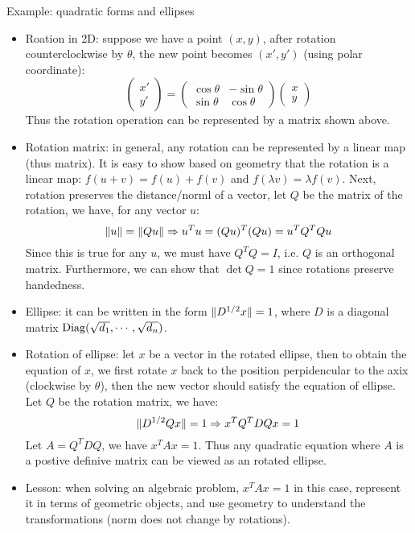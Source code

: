 \documentclass{report}
\begin{document}
Example: quadratic forms and ellipses
\begin{itemize}
	\item Roation in 2D: suppose we have a point $(x,y)$, after rotation counterclockwise by $\theta$, the new point becomes $(x',y')$ (using polar coordinate):
	\begin{equation}
	\left( \begin{array}{l} x'\\ y' \end{array} \right)	=  \left( \begin{array}{ll} \cos\theta & -\sin \theta\\ \sin\theta & \cos \theta \end{array} \right) \left( \begin{array}{l} x\\ y \end{array} \right)
	\end{equation}
	Thus the rotation operation can be represented by a matrix shown above. 
	
	\item Rotation matrix: in general, any rotation can be represented by a linear map (thus matrix). It is easy to show based on geometry that the rotation is a linear map: $f(u+v) = f(u)+f(v)$ and $f(\lambda v) = \lambda f(v)$. Next, rotation preserves the distance/norml of a vector, let $Q$ be the matrix of the rotation, we have, for any vector $u$: 
	\begin{equation}
	\lVert u\rVert = \lVert Qu\rVert \Rightarrow u^T u = (Qu)^T (Qu) = u^T Q^T Q u	
	\end{equation}
	Since this is true for any $u$, we must have $Q^T Q = I$, i.e. $Q$ is an orthogonal matrix. Furthermore, we can show that $\det Q = 1$ since rotations preserve handedness. 
	
	\item Ellipse: it can be written in the form $\lVert D^{1/2}x\rVert = 1$, where $D$ is a diagonal matrix ${\rm Diag}(\sqrt{d_1}, \cdots, \sqrt{d_n})$. 
	
	\item Rotation of ellipse: let $x$ be a vector in the rotated ellipse, then to obtain the equation of $x$, we first rotate $x$ back to the position perpidencular to the axix (clockwise by $\theta$), then the new vector should satisfy the equation of ellipse. Let $Q$ be the rotation matrix, we have: 
	\begin{equation}
	\lVert D^{1/2} Q x\rVert = 1 \Rightarrow x^T Q^T D Q x = 1
	\end{equation}
	Let $A = Q^T D Q$, we have $x^T A x = 1$. Thus any quadratic equation where $A$ is a postive definive matrix can be viewed as an rotated ellipse. 
	
	\item Lesson: when solving an algebraic problem, $x^T A x = 1$ in this case, represent it in terms of geometric objects, and use geometry to understand the transformations (norm does not change by rotations). 
\end{itemize}
\end{document}
